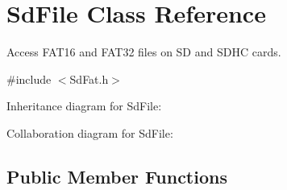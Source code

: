 \hypertarget{class_sd_file}{}\section{Sd\+File Class Reference}
\label{class_sd_file}


Access F\+A\+T16 and F\+A\+T32 files on SD and S\+D\+HC cards.  




{\ttfamily \#include $<$Sd\+Fat.\+h$>$}



Inheritance diagram for Sd\+File\+:


Collaboration diagram for Sd\+File\+:
\subsection*{Public Member Functions}
